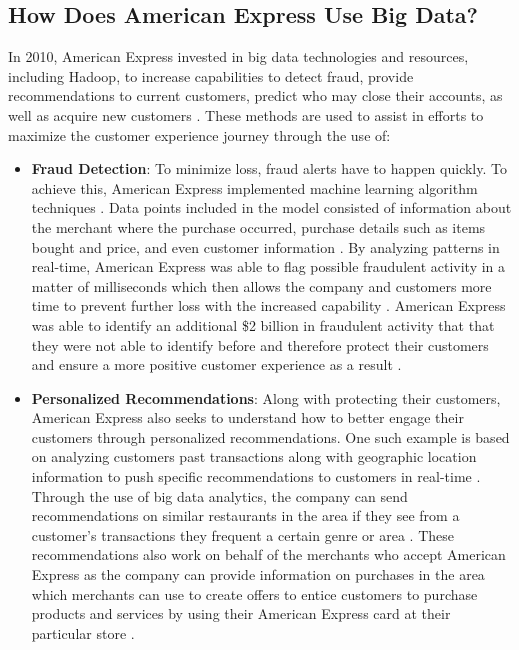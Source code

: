 \documentclass[sigconf]{acmart}
\begin{document}
  \subsection{How Does American Express Use Big Data?}
  In 2010, American Express invested in big data technologies and resources, including Hadoop, to increase capabilities to detect fraud, provide recommendations to current customers, predict who may close their accounts, as well as acquire new customers \cite{Woodie2016}. These methods are used to assist in efforts to maximize the customer experience journey through the use of:
  
 \begin{itemize}
 \item \textbf{Fraud Detection}: To minimize loss, fraud alerts have to happen quickly. To achieve this, American Express implemented machine learning algorithm techniques \cite{Manglani2017}. Data points included in the model consisted of information about the merchant where the purchase occurred, purchase details such as items bought and price, and even customer information \cite{Manglani2017}. By analyzing patterns in real-time, American Express was able to flag possible fraudulent activity in a matter of milliseconds which then allows the company and customers more time to prevent further loss with the increased capability \cite{Manglani2017}. American Express was able to identify an additional \$2 billion in fraudulent activity that that they were not able to identify before and therefore protect their customers and ensure a more positive customer experience as a result \cite{Manglani2017}.  
 
 \item \textbf{Personalized Recommendations}: Along with protecting their customers, American Express also seeks to understand how to better engage their customers through personalized recommendations. One such example is based on analyzing customers past transactions along with geographic location information to push specific recommendations to customers in real-time \cite{Woodie2016}. Through the use of big data analytics, the company can send recommendations on similar restaurants in the area if they see from a customer's transactions they frequent a certain genre or area \cite{Woodie2016}. These recommendations also work on behalf of the merchants who accept American Express as the company can provide information on purchases in the area which merchants can use to create offers to entice customers to purchase products and services by using their American Express card at their particular store \cite{Economist2016}.  
 

\end{itemize}
\end{document}
